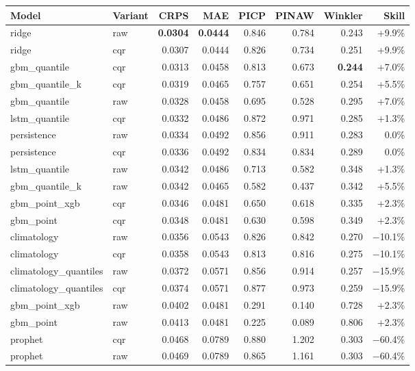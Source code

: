 \documentclass[11pt,a4paper,oneside]{report}
\begin{document}
\par\medskip
\begingroup
\small\setlength{\tabcolsep}{5pt}
\begin{tabular}{@{}llrrrrrr@{}}
\toprule
\textbf{Model} & \textbf{Variant} & \textbf{CRPS} & \textbf{MAE} & \textbf{PICP} & \textbf{PINAW} & \textbf{Winkler} & \textbf{Skill} \\
\midrule
ridge & raw & \textbf{0.0304} & \textbf{0.0444} & 0.846 & 0.784 & 0.243 & +9.9\% \\
ridge & cqr & 0.0307 & 0.0444 & 0.826 & 0.734 & 0.251 & +9.9\% \\
gbm\_quantile & cqr & 0.0313 & 0.0458 & 0.813 & 0.673 & \textbf{0.244} & +7.0\% \\
gbm\_quantile\_k & cqr & 0.0319 & 0.0465 & 0.757 & 0.651 & 0.254 & +5.5\% \\
gbm\_quantile & raw & 0.0328 & 0.0458 & 0.695 & 0.528 & 0.295 & +7.0\% \\
lstm\_quantile & cqr & 0.0332 & 0.0486 & 0.872 & 0.971 & 0.285 & +1.3\% \\
persistence & raw & 0.0334 & 0.0492 & 0.856 & 0.911 & 0.283 & 0.0\% \\
persistence & cqr & 0.0336 & 0.0492 & 0.834 & 0.834 & 0.289 & 0.0\% \\
lstm\_quantile & raw & 0.0342 & 0.0486 & 0.713 & 0.582 & 0.348 & +1.3\% \\
gbm\_quantile\_k & raw & 0.0342 & 0.0465 & 0.582 & 0.437 & 0.342 & +5.5\% \\
gbm\_point\_xgb & cqr & 0.0346 & 0.0481 & 0.650 & 0.618 & 0.335 & +2.3\% \\
gbm\_point & cqr & 0.0348 & 0.0481 & 0.630 & 0.598 & 0.349 & +2.3\% \\
climatology & raw & 0.0356 & 0.0543 & 0.826 & 0.842 & 0.270 & $-$10.1\% \\
climatology & cqr & 0.0358 & 0.0543 & 0.813 & 0.816 & 0.275 & $-$10.1\% \\
climatology\_quantiles & raw & 0.0372 & 0.0571 & 0.856 & 0.914 & 0.257 & $-$15.9\% \\
climatology\_quantiles & cqr & 0.0374 & 0.0571 & 0.877 & 0.973 & 0.259 & $-$15.9\% \\
gbm\_point\_xgb & raw & 0.0402 & 0.0481 & 0.291 & 0.140 & 0.728 & +2.3\% \\
gbm\_point & raw & 0.0413 & 0.0481 & 0.225 & 0.089 & 0.806 & +2.3\% \\
prophet & cqr & 0.0468 & 0.0789 & 0.880 & 1.202 & 0.303 & $-$60.4\% \\
prophet & raw & 0.0469 & 0.0789 & 0.865 & 1.161 & 0.303 & $-$60.4\% \\
\bottomrule
\end{tabular}
\endgroup
\par\medskip
\end{document}
